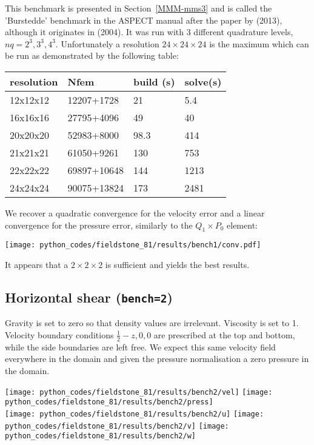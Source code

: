 This benchmark is presented in Section~\ref{MMM-mms3} and is called the 
'Burstedde' benchmark in the ASPECT manual after 
the paper by \textcite{busa13} (2013), although it originates in \textcite{dobo04} (2004). 
It was run with 3 different quadrature levels, $nq=2^3,3^3,4^3$. 
Unfortunately a resolution $24\times 24\times 24$ is the maximum which can be run as demonstrated 
by the following table:

\begin{center}
\begin{tabular}{llll}
\hline
resolution &Nfem           &build (s) &solve(s) \\
\hline\hline
12x12x12   &12207+1728     &21        &5.4\\
16x16x16   &27795+4096     &49        &40\\
20x20x20   &52983+8000     &98.3      &414\\
21x21x21   &61050+9261     &130       &753 \\
22x22x22   &69897+10648    &144       &1213\\
24x24x24   &90075+13824    &173       &2481\\
\hline
\end{tabular}
\end{center}
 
We recover a quadratic convergence for the velocity error and a linear convergence for the pressure error, 
similarly to the $Q_1\times P_0$ element:

\begin{center}
\texttt{[image: python\_codes/fieldstone\_81/results/bench1/conv.pdf]}
\end{center}

It appears that a $2 \times 2\times 2$ is sufficient and yields the best results.

\subsection*{Horizontal shear ({\tt bench=2})}

Gravity is set to zero so that density values are irrelevant. Viscosity is set to 1.
Velocity boundary conditions $\frac12-z,0,0$ are prescribed at the top and bottom, 
while the side boundaries are left free. We expect this same velocity field everywhere in the 
domain and given the pressure normalisation a zero pressure in the domain. 

\begin{center}
\texttt{[image: python\_codes/fieldstone\_81/results/bench2/vel]}
\texttt{[image: python\_codes/fieldstone\_81/results/bench2/press]}\\
\texttt{[image: python\_codes/fieldstone\_81/results/bench2/u]}
\texttt{[image: python\_codes/fieldstone\_81/results/bench2/v]}
\texttt{[image: python\_codes/fieldstone\_81/results/bench2/w]}
\end{center}

